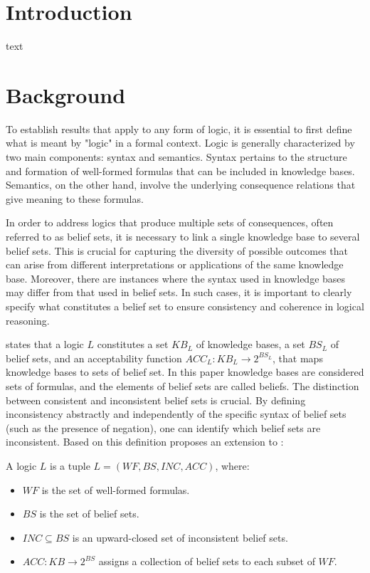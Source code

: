 \section{Introduction}
text

\section{Background}
To establish results that apply to any form of logic, it is essential to first define what is meant by "logic" in a formal context.
Logic is generally characterized by two main components: syntax and semantics.
Syntax pertains to the structure and formation of well-formed formulas that can be included in knowledge bases.
Semantics, on the other hand, involve the underlying consequence relations that give meaning to these formulas.

In order to address logics that produce multiple sets of consequences, often referred to as belief sets, it is necessary to link a single knowledge base to several belief sets.
This is crucial for capturing the diversity of possible outcomes that can arise from different interpretations or applications of the same knowledge base.
Moreover, there are instances where the syntax used in knowledge bases may differ from that used in belief sets.
In such cases, it is important to clearly specify what constitutes a belief set to ensure consistency and coherence in logical reasoning.

\cite{brewka_equilibria_2007} states that a logic \(L\) constitutes a set \(KB_L\) of knowledge bases, a set \(BS_L\) of belief sets, and an acceptability function \(ACC_L: KB_L \to 2^{BS_L}\), that maps knowledge bases to sets of belief set.
In this paper knowledge bases are considered sets of formulas, and the elements of belief sets are called beliefs.
The distinction between consistent and inconsistent belief sets is crucial.
By defining inconsistency abstractly and independently of the specific syntax of belief sets (such as the presence of negation), one can identify which belief sets are inconsistent.
Based on this definition \cite{brewka_strong_2019} proposes an extension to \cite{brewka_equilibria_2007}:

A logic \(L\) is a tuple \(L = (WF, BS, INC, ACC)\), where:
\begin{itemize}
      \item \(WF\) is the set of well-formed formulas.
      \item \(BS\) is the set of belief sets.
      \item \(INC \subseteq BS\) is an upward-closed set of inconsistent belief sets.
      \item \(ACC: KB \to 2^{BS}\) assigns a collection of belief sets to each subset of \(WF\).
\end{itemize}

